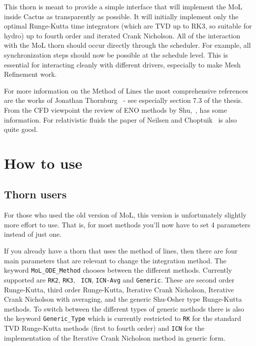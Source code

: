 This thorn is meant to provide a simple interface that will implement
the MoL inside Cactus as transparently as possible. It will initially
implement only the optimal Runge-Kutta time integrators (which are TVD
up to RK3, so suitable for hydro) up to fourth order and iterated
Crank Nicholson. All of the interaction with the MoL thorn should
occur directly through the scheduler. For example, all synchronization
steps should now be possible at the schedule level. This is essential
for interacting cleanly with different drivers, especially to make
Mesh Refinement work.

For more information on the Method of Lines the most comprehensive
references are the works of Jonathan
Thornburg~\cite{CactusBase_MoL_Thornburg93,CactusBase_MoL_Thornburg99}
- see especially section 7.3 of the thesis. From the CFD viewpoint the
review of ENO methods by Shu,~\cite{CactusBase_MoL_Shu99}, has some
information. For relativistic fluids the paper of Neilsen and
Choptuik~\cite{CactusBase_MoL_Neilsen00} is also quite good.

\section{How to use}
\label{CactusBase_MoL_sec:use}


\subsection{Thorn users}
\label{CactusBase_MoL_sec:useruse}

For those who used the old version of MoL, this version is
unfortunately slightly more effort to use. That is, for most methods
you'll now have to set 4 parameters instead of just one. 

If you already have a thorn that uses the method of lines, then there
are four main parameters that are relevant to change the integration
method. The keyword {\tt MoL\_ODE\_Method} chooses between the
different methods. Currently supported are {\tt RK2}, {\tt RK3}, {\tt
  ICN}, {\tt ICN-Avg} and {\tt Generic}. These are second order
Runge-Kutta, third order Runge-Kutta, Iterative Crank Nicholson,
Iterative Crank Nicholson with averaging, and the generic Shu-Osher
type Runge-Kutta methods. To switch between the different types of
generic methods there is also the keyword {\tt Generic\_Type} which is
currently restricted to {\tt RK} for the standard TVD Runge-Kutta
methods (first to fourth order) and {\tt ICN} for the implementation
of the Iterative Crank Nicholson method in generic form.

